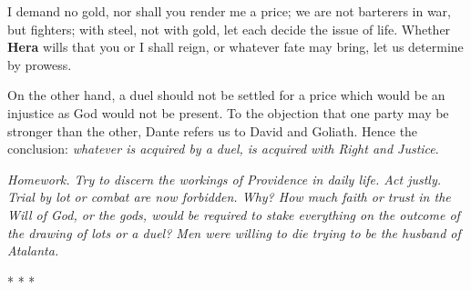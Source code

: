\begin{quotex}
I demand no gold, nor shall you render me a price; we are not barterers in war, but fighters; with steel, not with gold, let each decide the issue of life. Whether \textbf{Hera} wills that you or I shall reign, or whatever fate may bring, let us determine by prowess.
\end{quotex}


On the other hand, a duel should not be settled for a price which would be an injustice as God would not be present. To the objection that one party may be stronger than the other, Dante refers us to David and Goliath. Hence the conclusion: \emph{whatever is acquired by a duel, is acquired with Right and Justice}.

\textit{Homework. Try to discern the workings of Providence in daily life. Act justly. Trial by lot or combat are now forbidden. Why? How much faith or trust in the Will of God, or the gods, would be required to stake everything on the outcome of the drawing of lots or a duel? Men were willing to die trying to be the husband of Atalanta.}



\begin{center}* * *\end{center}

